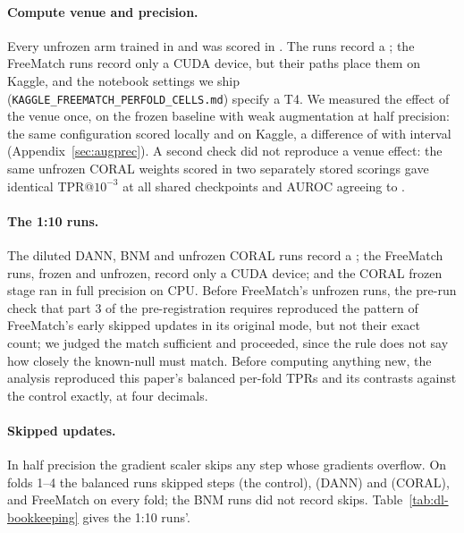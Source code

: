 \paragraph{Compute venue and precision.} Every unfrozen arm trained in \venueTrainPrecision{}
and was scored in \venueEvalPrecision{}. The \venueGpuArms{} runs record a \venueGpu{}; the
FreeMatch runs record only a CUDA device, but their paths place them on Kaggle, and the
notebook settings we ship (\texttt{KAGGLE\_FREEMATCH\_PERFOLD\_CELLS.md}) specify a T4. We
measured the effect
of the venue once, on the frozen baseline with weak augmentation at half precision: the same
configuration scored \augprecCellC{} locally and \augprecCellCKaggle{} on Kaggle, a difference
of \augprecVenueDiff{} with interval \augprecVenueCI{} (Appendix~\ref{sec:augprec}). A second
check did not reproduce a venue effect: the same unfrozen CORAL weights scored in two separately
stored scorings gave identical TPR@$10^{-3}$ at all \venueCoralCheckpoints{} shared checkpoints
and AUROC agreeing to \venueCoralMaxAuroc{}.

\paragraph{The 1:10 runs.} The diluted DANN, BNM and unfrozen CORAL runs record a \venueGpu{};
the FreeMatch runs, frozen and unfrozen, record only a CUDA device; and the CORAL frozen stage
ran in full precision on CPU. Before FreeMatch's unfrozen runs, the pre-run check that part 3 of
the pre-registration requires reproduced the pattern of FreeMatch's early skipped updates in
its original mode, but not their exact count; we judged the match sufficient and proceeded,
since the rule does not say how closely the known-null must match. Before computing anything new,
the analysis reproduced this paper's balanced per-fold TPRs and its \dlReproNWord{} contrasts
against the control exactly, at four decimals.

\paragraph{Skipped updates.} In half precision the gradient scaler skips any step whose
gradients overflow. On folds 1--4 the balanced runs skipped \skipLamList{} steps (the control),
\skipDannList{} (DANN) and \skipCoralList{} (CORAL), and FreeMatch \skipFmEach{} on every fold;
the BNM runs did not record skips. Table~\ref{tab:dl-bookkeeping} gives the 1:10 runs'.

